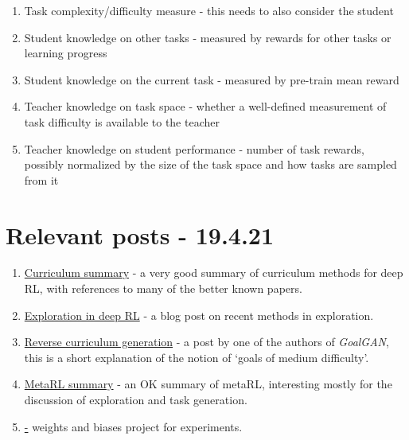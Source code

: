 \documentclass[letterpaper]{article}
\theoremstyle{definition}
\begin{document}
\begin{enumerate}
	\item Task complexity/difficulty measure - this needs to also consider the student
	\item Student knowledge on other tasks - measured by rewards for other tasks or learning progress
	\item Student knowledge on the current task - measured by pre-train mean reward
	\item Teacher knowledge on task space - whether a well-defined measurement of task difficulty is available to the teacher
	\item Teacher knowledge on student performance - number of task rewards, possibly normalized by the size of the task space and how tasks are sampled from it
\end{enumerate}

\section{Relevant posts - 19.4.21} \label{sec:blogs}

\begin{enumerate}
	\item 
	\href{https://lilianweng.github.io/lil-log/2020/01/29/curriculum-for-reinforcement-learning.html}{Curriculum summary} - a very good summary of curriculum methods for deep RL, with references to many of the better known papers.
	
	\item \href{https://lilianweng.github.io/lil-log/2020/06/07/exploration-strategies-in-deep-reinforcement-learning.html}{Exploration in deep RL} - a blog post on recent methods in exploration.
	
	\item 
	\href{https://bair.berkeley.edu/blog/2017/12/20/reverse-curriculum/}{Reverse curriculum generation} - a post by one of the authors of \textit{GoalGAN}, this is a short explanation of the notion of `goals of medium difficulty'.
	
	\item 
	\href{https://lilianweng.github.io/lil-log/2019/06/23/meta-reinforcement-learning.html}{MetaRL summary} - an OK summary of metaRL, interesting mostly for the discussion of exploration and task generation.
	
	\item 
	\href{https://wandb.ai/liorf/curriculum_rl} - weights and biases project for experiments.

\end{enumerate}
\end{document}
